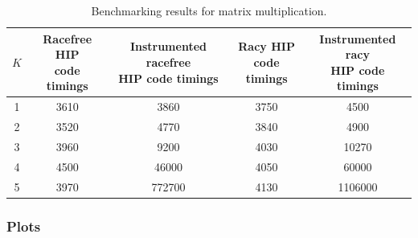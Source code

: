 \documentclass{btp}
\begin{document}
\begin{table}[H]
	\caption {Benchmarking results for matrix multiplication.}
	\begin{adjustbox}{center}
		{\renewcommand{\arraystretch}{1.2}
			\begin{tabular}{|c||c|c||c|c|}
				\hline
				$K$ & \makecell{Racefree HIP                           \\ code timings}  & \makecell{Instrumented racefree \\ HIP code timings}                & \makecell{Racy HIP \\ code timings} & \makecell{Instrumented racy \\ HIP code timings} \\
				\hline
				1   & 3610                   & 3860   & 3750 & 4500    \\
				\hline
				2   & 3520                   & 4770   & 3840 & 4900    \\
				\hline
				3   & 3960                   & 9200   & 4030 & 10270   \\
				\hline
				4   & 4500                   & 46000  & 4050 & 60000   \\
				\hline
				5   & 3970                   & 772700 & 4130 & 1106000 \\
				\hline
			\end{tabular}}
	\end{adjustbox}
\end{table}

\subsubsection{Plots}
\end{document}
